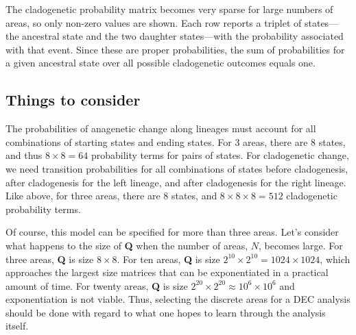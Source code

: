The cladogenetic probability matrix becomes very sparse for large numbers of areas, so only non-zero values are shown.
Each row reports a triplet of states---the ancestral state and the two daughter states---with the probability associated with that event.
Since these are proper probabilities, the sum of probabilities for a given ancestral state over all possible cladogenetic outcomes equals one.

\subsection*{Things to consider}

The probabilities of anagenetic change along lineages must account for all combinations of starting states and ending states.
For 3 areas, there are 8 states, and thus $8 \times 8 = 64$ probability terms for pairs of states.
For cladogenetic change, we need transition probabilities for all combinations of states before cladogenesis, after cladogenesis for the left lineage, and after cladogenesis for the right lineage.
Like above, for three areas, there are 8 states, and $8 \times 8 \times 8 = 512$ cladogenetic probability terms.

Of course, this model can be specified for more than three areas.
Let's consider what happens to the size of \textbf{Q} when the number of areas, $N$, becomes large.
For three areas, \textbf{Q} is size $8 \times 8$.
For ten areas, \textbf{Q} is size $2^{10} \times 2^{10} = 1024 \times 1024$, which approaches the largest size matrices that can be exponentiated in a practical amount of time.
For twenty areas, \textbf{Q} is size $2^{20} \times 2^{20} \approx 10^6 \times 10^6$ and exponentiation is not viable.
Thus, selecting the discrete areas for a DEC analysis should be done with regard to what one hopes to learn through the analysis itself.






